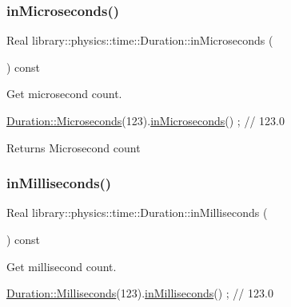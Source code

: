 \subsubsection{\texorpdfstring{in\+Microseconds()}{inMicroseconds()}}
{\footnotesize\ttfamily Real library\+::physics\+::time\+::\+Duration\+::in\+Microseconds (\begin{DoxyParamCaption}{ }\end{DoxyParamCaption}) const}



Get microsecond count. 


\begin{DoxyCode}
\hyperlink{classlibrary_1_1physics_1_1time_1_1_duration_a9082d43579a99fd667b0080de8adf8ed}{Duration::Microseconds}(123).\hyperlink{classlibrary_1_1physics_1_1time_1_1_duration_a69c9501a4432aac49cecd9d47da7c4f6}{inMicroseconds}() ; \textcolor{comment}{// 123.0}
\end{DoxyCode}


\begin{DoxyReturn}{Returns}
Microsecond count 
\end{DoxyReturn}
\mbox{\label{classlibrary_1_1physics_1_1time_1_1_duration_ac7c1fce0e8488954fe9e2abe1767548b}} 
\subsubsection{\texorpdfstring{in\+Milliseconds()}{inMilliseconds()}}
{\footnotesize\ttfamily Real library\+::physics\+::time\+::\+Duration\+::in\+Milliseconds (\begin{DoxyParamCaption}{ }\end{DoxyParamCaption}) const}



Get millisecond count. 


\begin{DoxyCode}
\hyperlink{classlibrary_1_1physics_1_1time_1_1_duration_ab6eab798898a96019a8c944cd565e161}{Duration::Milliseconds}(123).\hyperlink{classlibrary_1_1physics_1_1time_1_1_duration_ac7c1fce0e8488954fe9e2abe1767548b}{inMilliseconds}() ; \textcolor{comment}{// 123.0}
\end{DoxyCode}


